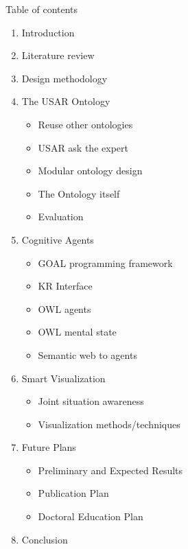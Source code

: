 Table of contents
\tableofcontents

\begin{enumerate}
\item Introduction
\item Literature review
\item Design methodology
\item The USAR Ontology
\begin{itemize}
\item Reuse other ontologies
\item USAR ask the expert 
\item Modular ontology design
\item The Ontology itself
\item Evaluation
\end{itemize}

\item Cognitive Agents
\begin{itemize}
\item GOAL programming framework
\item KR Interface
\item OWL agents
\item OWL mental state
\item Semantic web to agents
\end{itemize}

\item Smart Visualization
\begin{itemize}
\item Joint situation awareness
\item Visualization methods/techniques
\end{itemize}

\item Future Plans
\begin{itemize}
\item Preliminary and Expected Results
\item Publication Plan
\item Doctoral Education Plan
\end{itemize}
\item Conclusion
\end{enumerate}
  
  
  
  
  
  
  
  
  